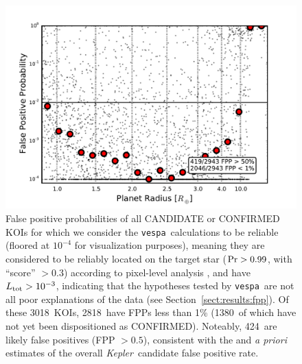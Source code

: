 \documentclass{emulateapj}
\newcommand{\figlabel}[1]{\label{fig:#1}}
\newcommand{\sectionname}{Section}
\newcommand{\Sect}[1]{\sectionname~\ref{sect:#1}}
\newcommand{\sect}[1]{\Sect{#1}}
\newcommand{\nreliable}{3018}
\newcommand{\nval}{2818}
\newcommand{\nreliableFP}{424}
\newcommand{\nvalnew}{1380}
\newcommand{\posprobthresh}{0.3}
\newcommand{\kepler}{\textit{Kepler}}
\newcommand{\vespa}{\texttt{vespa}}
\begin{document}
\begin{figure}[p]
\begin{center}
\includegraphics[width=7in]{figures/fpp_summary_all.pdf}
\end{center}
\caption{False positive probabilities of all CANDIDATE or CONFIRMED
  KOIs for which we consider the \vespa\ calculations to be reliable
  (floored at $10^{-4}$ for visualization purposes), meaning they are
  considered to be reliably located on the target star ($ {\rm Pr} >
  0.99$, with ``score'' $> \posprobthresh$) according to pixel-level analysis
  \citep{Bryson:KSCI}, and have $L_{\rm tot} > 10^{-3}$, indicating
  that the hypotheses tested by \vespa\ are not all poor explanations
  of the data (see \sect{results:fpp}).  Of these \nreliable\ KOIs,
  \nval\ have FPPs less than 1\% (\nvalnew\ of which have not yet been
  dispositioned as CONFIRMED).  Noteably, \nreliableFP\ are likely
  false positives (FPP $> 0.5$), consistent with the
  \citet{Morton:2011b} and \citet{Fressin:2013} \emph{a priori}
  estimates of the overall \kepler\ candidate false positive rate.
  \figlabel{fppall}}
\end{figure}
\end{document}
